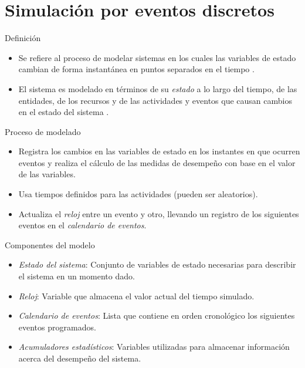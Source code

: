 \section{Simulación por eventos discretos}

\begin{frame}{Definición}
    \begin{itemize}
        \item Se refiere al proceso de modelar sistemas en los cuales las variables de estado cambian de forma instantánea en puntos separados en el tiempo \cite{LK}.
        \item El sistema es modelado en términos de su \textit{estado} a lo largo del tiempo, de las entidades, de los recursos y de las actividades y eventos que causan cambios en el estado del sistema \cite{BCN}.
    \end{itemize}
\end{frame}

\begin{frame}{Proceso de modelado}
    \begin{itemize}
        \item Registra los cambios en las variables de estado en los instantes en que ocurren eventos y realiza el cálculo de las medidas de desempeño con base en el valor de las variables. 
        \item Usa tiempos definidos para las actividades (pueden ser aleatorios).
        \item Actualiza el \textit{reloj} entre un evento y otro, llevando un registro de los siguientes eventos en el \textit{calendario de eventos}.
    \end{itemize}
\end{frame}

\begin{frame}{Componentes del modelo}
    \begin{itemize}
        \item \textit{Estado del sistema}:  Conjunto de variables de estado necesarias para describir el sistema en un momento dado.
        \item \textit{Reloj}: Variable que almacena el valor actual del tiempo simulado.
        \item \textit{Calendario de eventos}: Lista que contiene en orden cronológico los siguientes eventos programados.
        \item \textit{Acumuladores estadísticos}: Variables utilizadas para almacenar información acerca del desempeño del sistema.
    \end{itemize}
\end{frame}

